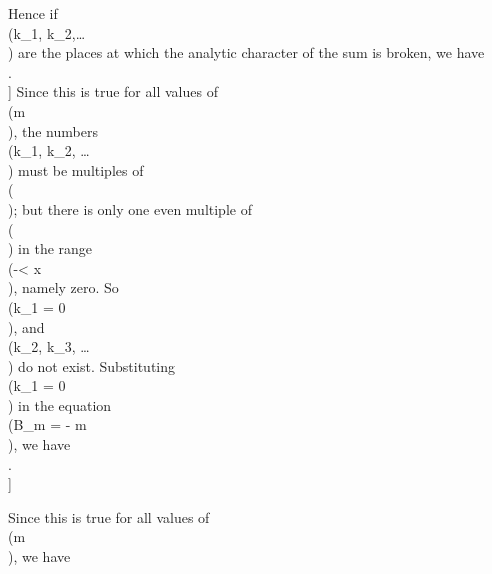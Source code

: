 Hence if \\(k_{1}, k_{2},\ldots\\) are the places at which the analytic
character of the sum is broken, we have
\\[ 
0
=
\pi A_{m}
=
\left[
  \sin m k_{1} \left\{
    f(k_{1} - 0) - f(k_{1} + 0)
  \right\}
  +
  \sin m k_{2} \left\{
    f(k_{2} - 0) - f(k_{2} + 0)
  \right\}
  +
  \cdots
\right].
\\] 
Since this is true for all values of \\(m\\), the numbers
\\(k_{1}, k_{2}, \ldots\\) must
be multiples of \\(\pi\\); but
there is only one even multiple of \\(\pi\\) in the range
\\(-\pi < x \leq \pi\\), namely zero.
So \\(k_{1} = 0\\),
and \\(k_{2}, k_{3}, \ldots\\) do not exist.
Substituting \\(k_{1} = 0\\) in the equation
\\(B_{m} =  -  \cos m \pi\\), we have
\\[ 
\pi (\frac{1}{2} - \frac{1}{2} \cos m \pi)
=
- \left[
  \cos m \pi \left\{
    f(\pi - 0) - f(-\pi + 0)
  \right\}
  + f(-0)
  - f(+0)
\right].
\\] 

Since this is true for all values of \\(m\\), we have
\\[ 
\frac{1}{2} \pi = f(+0) - f(-0),
\quad
\frac{1}{2} \pi = f(\pi - 0) - f(-\pi + 0).
\\] 

